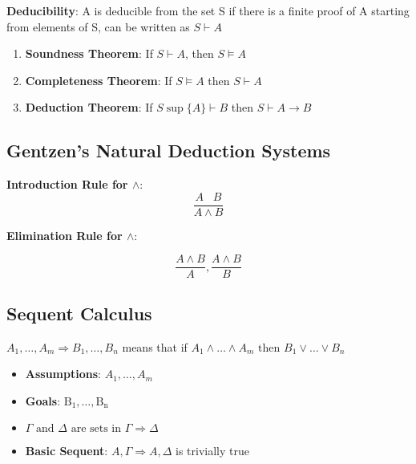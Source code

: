 \documentclass{article}
\begin{document}
\bigskip
\noindent
\textbf{Deducibility}: A is deducible from the set S if there is a finite proof of A starting from elements of S, can be written as $S \vdash A$
\begin{enumerate}
    \item \textbf{Soundness Theorem}: If $S \vdash A$, then $S \vDash A$
    \item \textbf{Completeness Theorem}: If $S \vDash A$ then $S \vdash A$
    \item \textbf{Deduction Theorem}: If $S \sup \{ A \} \vdash B$ then $S \vdash A \rightarrow B$
\end{enumerate}

\subsection{Gentzen's Natural Deduction Systems}
\textbf{Introduction Rule for $\wedge$}: 
$$\frac{A \; \; \; B}{A \wedge B}$$

\noindent
\textbf{Elimination Rule for $\wedge$}: 

$$\frac{A \wedge B}{A}, \frac{A \wedge B}{B}$$

\subsection{Sequent Calculus}
$A_{1}, \dots, A_{m} \Rightarrow B_{1}, \dots, B_{n}$ means that if $A_{1} \wedge \ldots \wedge A_{m} \text { then } B_{1} \vee \ldots \vee B_{n}$
\begin{itemize}
    \item \textbf{Assumptions}: $A_{1}, \ldots, A_{m}$
    \item \textbf{Goals}: $\mathrm{B}_{1}, \ldots, \mathrm{B}_{\mathrm{n}}$
    \item $\Gamma \text { and } \Delta \text { are sets in } \Gamma \Rightarrow \Delta$
    \item \textbf{Basic Sequent}: $A, \Gamma \Rightarrow A, \Delta$ is trivially true
\end{itemize}
\end{document}
